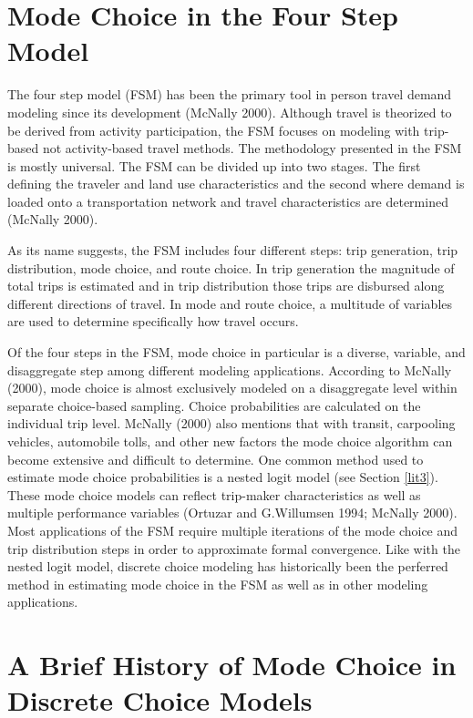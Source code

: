 \documentclass[12pt, oneside, openright]{byuthesis}
\begin{document}
\hypertarget{lit1}{%
\section{Mode Choice in the Four Step Model}\label{lit1}}

The four step model (FSM) has been the primary tool in person travel demand modeling since its development (McNally 2000). Although travel is theorized to be derived from activity participation, the FSM focuses on modeling with trip-based not activity-based travel methods. The methodology presented in the FSM is mostly universal. The FSM can be divided up into two stages. The first defining the traveler and land use characteristics and the second where demand is loaded onto a transportation network and travel characteristics are determined (McNally 2000).

As its name suggests, the FSM includes four different steps: trip generation, trip distribution, mode choice, and route choice. In trip generation the magnitude of total trips is estimated and in trip distribution those trips are disbursed along different directions of travel. In mode and route choice, a multitude of variables are used to determine specifically how travel occurs.

Of the four steps in the FSM, mode choice in particular is a diverse, variable, and disaggregate step among different modeling applications. According to McNally (2000), mode choice is almost exclusively modeled on a disaggregate level within separate choice-based sampling. Choice probabilities are calculated on the individual trip level. McNally (2000) also mentions that with transit, carpooling vehicles, automobile tolls, and other new factors the mode choice algorithm can become extensive and difficult to determine. One common method used to estimate mode choice probabilities is a nested logit model (see Section \ref{lit3}). These mode choice models can reflect trip-maker characteristics as well as multiple performance variables (Ortuzar and G.Willumsen 1994; McNally 2000). Most applications of the FSM require multiple iterations of the mode choice and trip distribution steps in order to approximate formal convergence. Like with the nested logit model, discrete choice modeling has historically been the perferred method in estimating mode choice in the FSM as well as in other modeling applications.

\hypertarget{lit2}{%
\section{A Brief History of Mode Choice in Discrete Choice Models}\label{lit2}}
\end{document}
